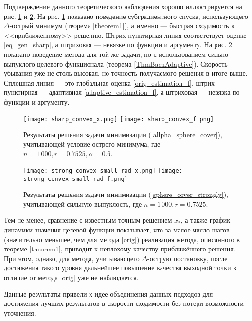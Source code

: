     Подтверждение данного теоретического наблюдения хорошо иллюстрируется на рис. \ref{res_sharp_convex} и \ref{res_strong_convex}. На рис. \ref{res_sharp_convex} показано поведение субградиентного спуска, использующего $\Delta$-острый минимум (теорема \ref{theorem1}), а именно --- быстрая сходимость к <<приближенному>> решению. Штрих-пунктирная линия соответствует оценке \eqref{eq_gen_sharp}, а штриховая --- невязке по функции и аргументу. На рис. \ref{res_strong_convex} показано поведение метода для той же задачи, но с использованием сильно выпуклого целевого функционала (теорема \ref{ThmBachAdaptive}). Скорость убывания уже не столь высокая, но точность получаемого решения в итоге выше. Сплошная линия --- это глобальная оценка \eqref{orig_estimation_f}, штрих-пунктирная --- адаптивная \eqref{adaptive_estimation_f}, а штриховая --- невязка по функции и аргументу.

    \begin{figure}[h]
        \texttt{[image: sharp\_convex\_x.png]}
        \endminipage\hfill
        \texttt{[image: sharp\_convex\_f.png]}
        \endminipage\hfill
        \caption{ Результаты решения задачи минимизации (\ref{allpha_sphere_cover}), учитывающей условие острого минимума, где  $n= 1\,000, r = 0.7525, \alpha = 0.6$.}
        \label{res_sharp_convex}
    \end{figure}

    \begin{figure}[h]
        \texttt{[image: strong\_convex\_small\_rad\_x.png]}
        \endminipage\hfill
        \texttt{[image: strong\_convex\_small\_rad\_f.png]}
        \endminipage\hfill
        \caption{ Результаты решения задачи минимизации (\ref{sphere_cover_strongly}), учитывающей сильную выпуклость, где  $n= 1\,000, r = 0.7525$.}
        \label{res_strong_convex}
    \end{figure}

    Тем не менее, сравнение с известным точным решением $x_*$, а также график динамики значения целевой функции показывает, что за малое число шагов (значительно меньшее, чем для метода \eqref{orig}) реализация метода, описанного в теореме \ref{theorem1}, приводит к неплохому качеству приближённого решения. При этом, однако, для метода, учитывающего $\Delta$-острую постановку, после достижения такого уровня дальнейшее повышение качества выходной точки в отличие от метода \eqref{orig} уже не наблюдается. 

    Данные результаты привели к идее объединения данных подходов для достижения лучших результатов в скорости сходимости без потери возможности уточнения.

\FloatBarrier